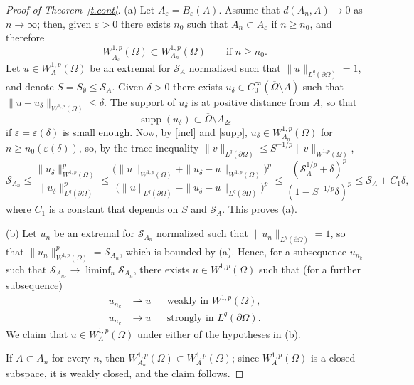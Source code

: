 \documentclass[11pt]{amsart}
\theoremstyle{remark}
\numberwithin{equation}{section}
\newcommand{\cS}{\mathcal{S}}
\DeclareMathOperator{\supp}{supp}
\begin{document}
\begin{proof}[Proof of Theorem~\ref{t.cont}]
(a) Let $A_\varepsilon=B_\varepsilon(A)$. Assume that $d(A_n,A)\to0$ as $n\to\infty$; then, given $\varepsilon>0$ there exists $n_0$ such that $A_n\subset A_\varepsilon$ if $n\ge n_0$, and therefore
\begin{equation}\label{incl}
W^{1,p}_{\overline{A_{\varepsilon}}}(\Omega)\subset W^{1,p}_{A_n}(\Omega)\qquad\text{if } n\ge n_0.
\end{equation}
Let $u\in W^{1,p}_A(\Omega)$ be an extremal for $\cS_A$ normalized such that $\|u\|_{L^q(\partial\Omega)}=1$, and denote $S=S_\emptyset\le\cS_A$. Given $\delta>0$ there exists $u_\delta\in C^\infty_0(\overline\Omega\setminus A)$ such that $\|u-u_\delta\|_{W^{1,p}(\Omega)}\le\delta$. The support of $u_\delta$ is at positive distance from $A$, so that
\begin{equation}\label{supp}
\supp(u_\delta)\subset\overline\Omega\setminus A_{2\varepsilon}
\end{equation}
if $\varepsilon=\varepsilon(\delta)$ is small enough. Now, by \eqref{incl} and \eqref{supp}, $u_\delta\in W^{1,p}_{A_n}(\Omega)$ for $n\ge n_0(\varepsilon(\delta))$, so, by the trace inequality $\|v\|_{L^q(\partial\Omega)}\le S^{-1/p}\|v\|_{W^{1,p}(\Omega)}$,
\[
\cS_{A_n}\le\frac{\|u_\delta\|^p_{W^{1,p}(\Omega)}}{\|u_\delta\|^p_{L^q(\partial\Omega)}}\le\frac{\big(\|u\|_{W^{1,p}(\Omega)}+\|u_\delta-u\|_{W^{1,p}(\Omega)}\big)^p}{\big(\|u\|_{L^q(\partial\Omega)}-\|u_\delta-u\|_{L^q(\partial\Omega)}\big)^p}\le\frac{(\cS_A^{1/p}+\delta)^p}{(1-S^{-1/p}\delta)^p}\le\cS_A+C_1\delta,
\]
where $C_1$ is a constant that depends on $S$ and $\cS_A$. This proves (a).

(b) Let $u_n$ be an extremal for $\cS_{A_n}$ normalized such that $\|u_n\|_{L^q(\partial\Omega)}=1$, so that $\|u_n\|^p_{W^{1,p}(\Omega)}=\cS_{A_n}$, which is bounded by (a). Hence, for a subsequence $u_{n_k}$ such that $\cS_{A_{n_k}}\to\liminf_n\cS_{A_n}$, there exists $u\in W^{1,p}(\Omega)$ such that (for a further subsequence)
\begin{equation}\label{conv4}
\begin{aligned}
u_{n_k}&\rightharpoonup u &&\text{weakly in } W^{1,p}(\Omega),\\
u_{n_k}&\to u &&\text{strongly in } L^q(\partial\Omega).
\end{aligned}
\end{equation}
We claim that $u\in W^{1,p}_A(\Omega)$ under either of the hypotheses in (b).

If $A\subset A_n$ for every $n$, then $W^{1,p}_{A_n}(\Omega)\subset W^{1,p}_A(\Omega)$; since $W^{1,p}_A(\Omega)$ is a closed subspace, it is weakly closed, and the claim follows.


\end{proof}
\end{document}
